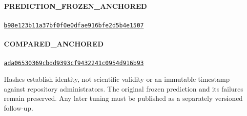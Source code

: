 \documentclass[10pt]{article}
\begin{document}
\paragraph{PREDICTION\_FROZEN\_ANCHORED}
\href{https://github.com/alexthegreat714/alex-blythe-site/commit/b98e123b11a37bf0f0e0dfae916bfe2d5b4e1507}{\texttt{b98e123b11a37bf0f0e0dfae916bfe2d5b4e1507}}
\paragraph{COMPARED\_ANCHORED}
\href{https://github.com/alexthegreat714/alex-blythe-site/commit/ada06530369cbdd9393cf9432241c0954d916b93}{\texttt{ada06530369cbdd9393cf9432241c0954d916b93}}
\par
Hashes establish identity, not scientific validity or an immutable timestamp against repository administrators. The original frozen prediction and its failures remain preserved. Any later tuning must be published as a separately versioned follow-up.
\end{document}
